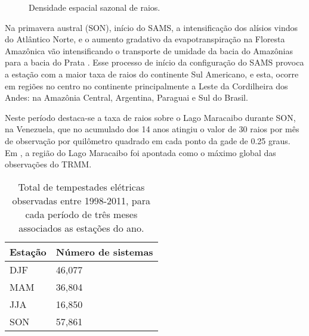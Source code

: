 \begin{figure}[!ht]
  \caption{Densidade espacial sazonal de raios.}
\label{TaxaFlash}
\end{figure} 


Na primavera austral (SON), início do SAMS, a intensificação dos alísios vindos do Atlântico Norte, e o aumento gradativo da evapotranspiração na Floresta Amazônica vão intensificando o transporte de umidade da bacia do Amazônias para a bacia do Prata \cite{marengo2004}.  Esse processo de início da configuração do SAMS provoca a estação com a maior taxa de raios do continente Sul Americano, e esta, ocorre em regiões no centro no continente principalmente a Leste da Cordilheira dos Andes: na Amazônia Central, Argentina, Paraguai e Sul do Brasil.


Neste período destaca-se a taxa de raios sobre o Lago Maracaibo durante SON, na Venezuela, que no acumulado dos 14 anos atingiu o valor de 30 raios por mês de observação por quilômetro quadrado em cada ponto da gade de 0.25 graus. Em , a região do Lago Maracaibo foi apontada como o máximo global das observações do TRMM. 


\begin{table}[!h]
\caption{Total de tempestades elétricas observadas entre 1998-2011, para cada período de três meses associados as estações do ano.}
\label{EstacaoQtd}
\centering
\small
\newcommand{\grayline}{\rowcolor[gray]{.88}}
\renewcommand {\tabularxcolumn }[1]{ >{\arraybackslash }m{#1}}
\begin{tabularx}{\textwidth}{W W} %
\hline \hline 
Estação & Número de sistemas \\[1.5pt]
 \hline
\grayline DJF & 46,077 \\[1.5pt]
MAM & 36,804\\[1.5pt]
\grayline JJA & 16,850\\[1.5pt] 
SON & 57,861\\[1.5pt]
\hline 
\end{tabularx}
\end{table}

